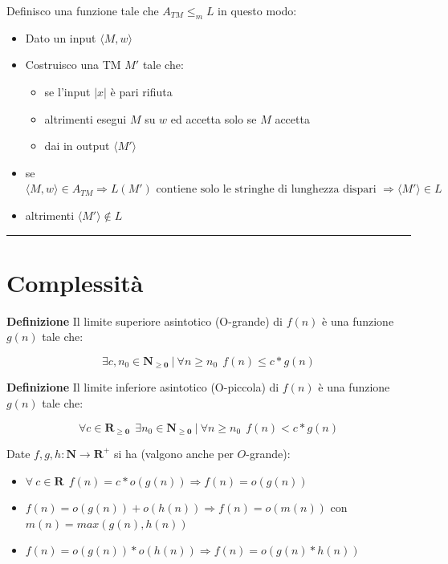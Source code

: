 \documentclass{article}
\begin{document}
\noindent Definisco una funzione tale che $A_{TM}\leq_m L$ in questo modo:
\begin{itemize}
    \item Dato un input $\langle M,w\rangle$
    \item Costruisco una TM $M'$ tale che:
        \begin{itemize}
            \item se l'input $|x|$ è pari rifiuta
            \item altrimenti esegui $M$ su $w$ ed accetta solo se $M$ accetta
            \item dai in output $\langle M'\rangle$\newline
        \end{itemize}
\end{itemize}

\begin{itemize}
    \item se $\langle M,w\rangle\in A_{TM} \Rightarrow L(M') \text{ contiene solo le stringhe di lunghezza dispari } \Rightarrow\langle M'\rangle\in L$

    \item altrimenti $\langle M'\rangle\notin L$

\end{itemize}

\noindent\rule{\textwidth}{0.5pt}\newline

\section{Complessità}

\noindent\textbf{Definizione} Il limite superiore asintotico (O-grande) di $f(n)$ è una funzione $g(n)$ tale che:

$$\exists c,n_0\in\mathbf{N_{\geq0}}\ |\ \forall n\geq n_0\ \ f(n)\leq c*g(n)$$\newline

\noindent\textbf{Definizione} Il limite inferiore asintotico (O-piccola) di $f(n)$ è una funzione $g(n)$ tale che:

$$\forall c\in\mathbf{R_{\geq0}}\ \ \exists n_0\in\mathbf{N_{\geq0}}\ |\ \forall n\geq n_0\ \ f(n) < c*g(n)$$\newline

\noindent Date $f,g,h:\mathbf{N}\rightarrow\mathbf{R}^+$ si ha (valgono anche per $O$-grande):
\begin{itemize}
    \item $\forall\ c\in\mathbf{R}\ \ f(n)=c*o(g(n))\Rightarrow f(n)=o(g(n))$ 
    
    \item $f(n)=o(g(n))+o(h(n))\Rightarrow f(n)=o(m(n))$ con $m(n)=max(g(n),h(n))$ 
    
    \item $f(n)=o(g(n))*o(h(n))\Rightarrow f(n)=o(g(n)*h(n))$ \newline
\end{itemize}
\end{document}
